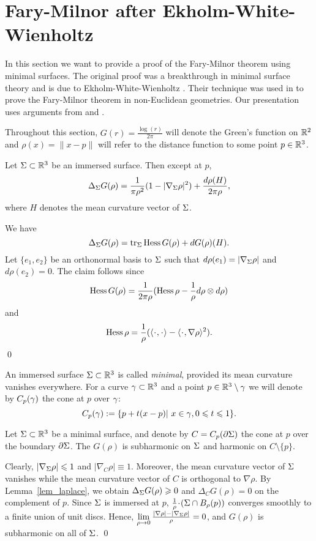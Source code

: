 \section{Fary-Milnor after Ekholm-White-Wienholtz}

In this section we want to provide a proof of the Fary-Milnor theorem using minimal surfaces.
The original proof was a breakthrough in minimal surface theory and is due to Ekholm-White-Wienholtz \cite{EWW_embed}. 
Their technique was used in \cite{CG_embed, St_structure} to prove the Fary-Milnor theorem in
non-Euclidean geometries. Our presentation uses arguments from \cite{EWW_embed} and \cite{CG_embed}.
\medskip

Throughout this section, $G(r)=\frac{\log(r)}{2\pi}$ will denote the Green's function on $\mathbb R^2$ and  $\rho(x)=\|x-p\|$ will refer to
the distance function to some point $p\in\mathbb R^3$.

\blem\label{lem_laplace} 
Let $\Sigma\subset \mathbb R^3$ be an immersed surface. Then except at $p$,
\[\Delta_\Sigma G(\rho)=\frac{1}{\pi\rho^2}(1-|\nabla_\Sigma \rho|^2)+\frac{d\rho(H)}{2\pi\rho},\]
where $H$ denotes the mean curvature vector of $\Sigma$. 
\elem

\proof
We have
\[\Delta_\Sigma G(\rho)=\operatorname{tr}_\Sigma\operatorname{Hess} G(\rho)+d G(\rho)(H).\]
Let $\{e_1,e_2\}$ be an orthonormal basis to $\Sigma$ such that $d\rho(e_1)=|\nabla_\Sigma \rho|$ and $d\rho(e_2)=0$. 
The claim follows since 
\[\operatorname{Hess} G(\rho)=\frac{1}{2\pi\rho}(\operatorname{Hess}\rho-\frac{1}{\rho}d\rho\otimes d\rho)\] 
and
\[\Hess\rho=\frac{1}{\rho}(\<\cdot,\cdot\>-\<\cdot,\nabla\rho\>^2).\]
\qed

\bdfn
An immersed surface $\Sigma\subset\mathbb R^3$ is called {\em minimal}, provided its mean curvature vanishes everywhere.
\edfn
For a curve $\gamma\subset\mathbb R^3$ and a point $p\in\mathbb R^3\setminus\gamma$ we will denote by $C_p(\gamma)$ the cone at $p$
over $\gamma$:
\[C_p(\gamma):=\{p+t(x-p)|\ x\in\gamma, 0\leqslant t\leqslant 1\}.\]
\medskip

\bcor\label{cor_subhar}
Let $\Sigma\subset\mathbb R^3$ be a minimal surface, and denote by $C=C_p(\partial\Sigma)$ the cone at $p$ over the boundary $\partial\Sigma$.
The $G(\rho)$ is subharmonic on $\Sigma$ and harmonic on $C\setminus\{p\}$.
\ecor

\proof
Clearly, $|\nabla_\Sigma\rho|\leqslant 1$ and $|\nabla_C\rho|\equiv 1$.
Moreover, the mean curvature vector of $\Sigma$ vanishes while the mean curvature vector of $C$
is orthogonal to $\nabla\rho$. By Lemma~\ref{lem_laplace}, we obtain $\Delta_\Sigma G(\rho)\geqslant 0$ and $\Delta_C G(\rho)= 0$
on the complement of $p$. Since $\Sigma$ is immersed at $p$, $\frac{1}{\rho}\cdot(\Si\cap B_\rho(p))$
converges smoothly to a finite union of unit discs. Hence, $\lim\limits_{\rho\to 0}\frac{|\nabla\rho|-|\nabla_\Sigma\rho|}{\rho}=0$, and
$G(\rho)$ is subharmonic on all of $\Sigma$.
\qed


